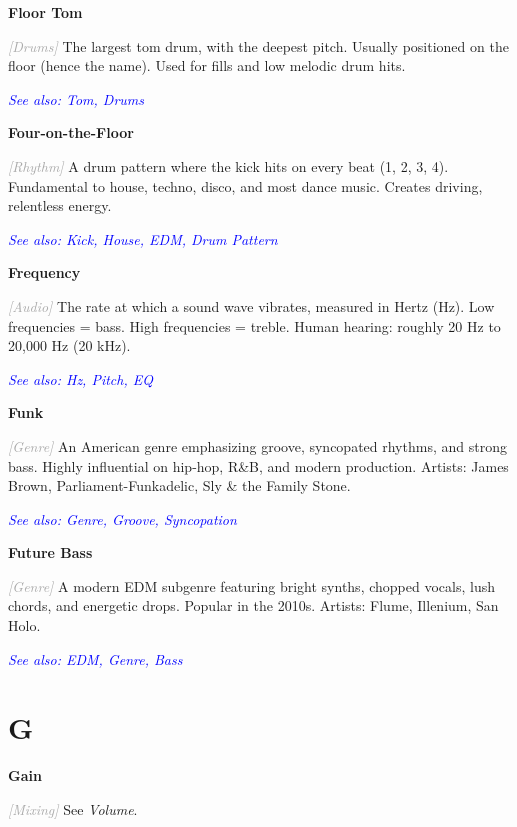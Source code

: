 \documentclass[11pt,letterpaper]{article}
\newcommand{\term}[1]{\textbf{\large\color{purple}#1}}
\newcommand{\category}[1]{\textcolor{darkgray}{\textit{\small [#1]}}}
\newcommand{\seealso}[1]{\textcolor{blue}{\textit{See also: #1}}}
\newenvironment{termdef}[1]
  {\noindent\term{#1}\par\nopagebreak}
  {\par\vspace{0.3em}}
\begin{document}
\begin{termdef}{Floor Tom}
\category{Drums}
The largest tom drum, with the deepest pitch. Usually positioned on the floor (hence the name). Used for fills and low melodic drum hits.

\seealso{Tom, Drums}
\end{termdef}

\begin{termdef}{Four-on-the-Floor}
\category{Rhythm}
A drum pattern where the kick hits on every beat (1, 2, 3, 4). Fundamental to house, techno, disco, and most dance music. Creates driving, relentless energy.

\seealso{Kick, House, EDM, Drum Pattern}
\end{termdef}

\begin{termdef}{Frequency}
\category{Audio}
The rate at which a sound wave vibrates, measured in Hertz (Hz). Low frequencies = bass. High frequencies = treble. Human hearing: roughly 20 Hz to 20,000 Hz (20 kHz).

\seealso{Hz, Pitch, EQ}
\end{termdef}

\begin{termdef}{Funk}
\category{Genre}
An American genre emphasizing groove, syncopated rhythms, and strong bass. Highly influential on hip-hop, R\&B, and modern production. Artists: James Brown, Parliament-Funkadelic, Sly \& the Family Stone.

\seealso{Genre, Groove, Syncopation}
\end{termdef}

\begin{termdef}{Future Bass}
\category{Genre}
A modern EDM subgenre featuring bright synths, chopped vocals, lush chords, and energetic drops. Popular in the 2010s. Artists: Flume, Illenium, San Holo.

\seealso{EDM, Genre, Bass}
\end{termdef}

\newpage


\section*{G}

\begin{termdef}{Gain}
\category{Mixing}
See \textit{Volume}.
\end{termdef}
\end{document}
